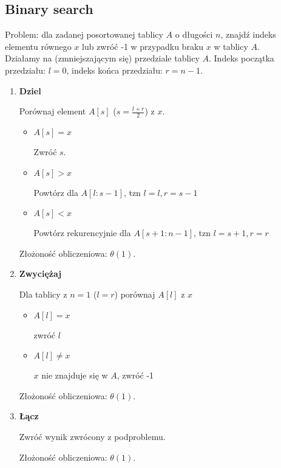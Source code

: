 \documentclass[main.tex]{subfiles}
\begin{document}
    \subsection{Binary search}

    Problem: dla zadanej posortowanej tablicy $A$ o długości $n$, znajdź indeks elementu
    równego $x$ lub zwróć -1 w przypadku braku $x$ w tablicy $A$.
    \[\]
    Działamy na (zmniejszającym się) przedziale tablicy $A$. Indeks początka przedziału:
    $l = 0$, indeks końca przedziału: $r = n - 1$.

    \begin{enumerate}
        \item \textbf{Dziel}

        Porównaj element $A[s]$ ($s = \frac{l+ r}{2}$) z $x$.

        \begin{itemize}
            \item $A[s] = x$

            Zwróć $s$.

            \item $A[s] > x$

            Powtórz dla $A[l : s - 1]$, tzn $l = l, r = s - 1$

            \item $A[s] < x$

            Powtórz rekurencyjnie dla $A[s + 1 : n - 1]$, tzn $l = s + 1, r = r$
        \end{itemize}

        Złożoność obliczeniowa: $\theta(1)$.

        \item \textbf{Zwyciężaj}

        Dla tablicy z $n = 1$ ($l = r$) porównaj $A[l]$ z $x$

        \begin{itemize}
            \item $A[l] = x$

            zwróć $l$
            \item $A[l] \neq x$

            $x$ nie znajduje się w $A$, zwróć -1
        \end{itemize}

        Złożoność obliczeniowa: $\theta(1)$.

        \item \textbf{Łącz}

        Zwróć wynik zwrócony z podproblemu.

        Złożoność obliczeniowa: $\theta(1)$.
    \end{enumerate}
\end{document}
